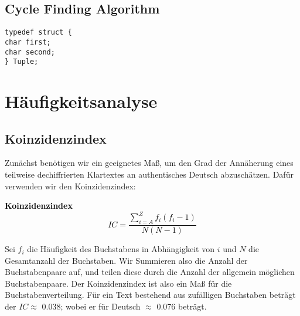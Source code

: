 \documentclass[ngerman, a4paper, footsepline, headsepline]{scrreport}
\newcommand{\fmbox}[1]{
	\begin{center}
		\fcolorbox{black}{yellow}
		{\parbox{0.88\textwidth}
			{\textcolor{black}
				{#1}
			}
		}
	\end{center}
}
\begin{document}
	\section{Cycle Finding Algorithm}\label{sec:cycle-finding-algorithm}
	\noindent
	\texttt{typedef struct \{} \\
	\hspace*{0.5cm} \texttt{char first;} \\
	\hspace*{0.5cm} \texttt{char second;} \\
	\texttt{\} Tuple;}
	
	
	
	\chapter{Häufigkeitsanalyse}\label{ch:haufigkeitsanalyse}
	\section{Koinzidenzindex}\label{sec:koinzidenzindex}
	\thispagestyle{scrheadings}
	
	Zunächst benötigen wir ein geeignetes Maß, um den Grad der Annäherung eines teilweise dechiffrierten Klartextes an authentisches Deutsch abzuschätzen.
	Dafür verwenden wir den Koinzidenzindex:
	
	\fmbox{\textbf{Koinzidenzindex}\[IC = \frac{\sum_{i=A}^{Z}f_i(f_i-1)}{N(N-1)}\]}
	
	
	Sei $f_i$ die Häufigkeit des Buchstabens in Abhängigkeit von $i$ und $N$ die Gesamtanzahl der Buchstaben.
	Wir Summieren also die Anzahl der Buchstabenpaare auf, und teilen diese durch die Anzahl der allgemein möglichen Buchstabenpaare.
	Der Koinzidenzindex ist also ein Maß für die Buchstabenverteilung.
	Für ein Text bestehend aus zufälligen Buchstaben beträgt der $IC \approx$ 0.038; wobei er für Deutsch $\approx$ 0.076 beträgt.
	\newpage
%	
%	
%	
%	
%	
%	
%	
%	
	
	\printbibliography[title=Quellen]
	
	
	
	
	
	
\end{document}
